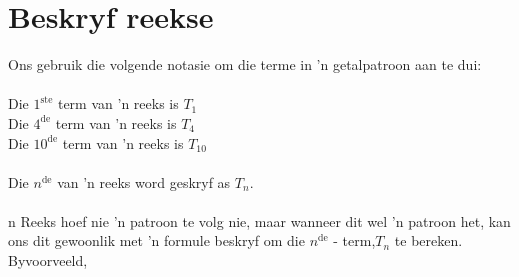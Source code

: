 \section{Beskryf reekse}

 
Ons gebruik die volgende notasie om die terme in 'n getalpatroon aan te dui:\\
\\
Die $1^{\mathrm{ste}}$ term van 'n reeks is $T_{1}$\\
Die $4^{\mathrm{de}}$  term van 'n reeks is $T_{4}$\\
Die $10^{\mathrm{de}}$  term van 'n reeks is $T_{10}$\\
\\
Die  ${n}^{\mathrm{de}}$  van ’n reeks word geskryf as ${T}_{n}$. \\
\\n Reeks hoef nie ’n patroon te volg nie, maar wanneer dit wel ’n patroon het, kan ons
dit gewoonlik met ’n formule beskryf om die ${n}^{\mathrm{de}}$ - term,${T}_{n}$ te bereken. 
Byvoorveeld,
     
